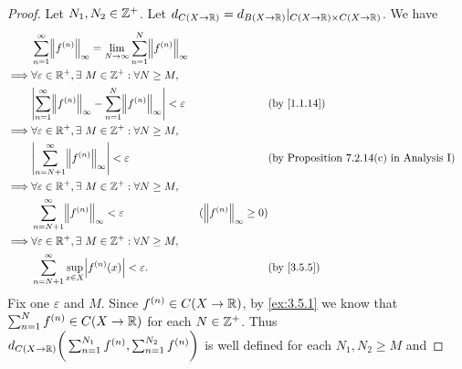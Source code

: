 \begin{proof}
  Let \(N_1, N_2 \in \mathbb{Z}^+\).
  Let \(d_{C(X \to \mathbb{R})} = d_{B(X \to \mathbb{R})}|_{C(X \to \mathbb{R}) \times C(X \to \mathbb{R})}\).
  We have
  \begin{align*}
             & \sum_{n = 1}^\infty \norm*{f^{(n)}}_\infty = \lim_{N \to \infty} \sum_{n = 1}^N \norm*{f^{(n)}}_\infty                                                                                     \\
    \implies & \forall \varepsilon \in \R^+, \exists\ M \in \Z^+ : \forall N \geq M,                                                                                                                      \\
             & \abs{\sum_{n = 1}^\infty \norm*{f^{(n)}}_\infty - \sum_{n = 1}^N \norm*{f^{(n)}}_\infty} < \varepsilon &                                 & \text{(by \cref{1.1.14})}                       \\
    \implies & \forall \varepsilon \in \R^+, \exists\ M \in \Z^+ : \forall N \geq M,                                                                                                                      \\
             & \abs{\sum_{n = N + 1}^\infty \norm*{f^{(n)}}_\infty} < \varepsilon                                     &                                 & \text{(by Proposition 7.2.14(c) in Analysis I)} \\
    \implies & \forall \varepsilon \in \R^+, \exists\ M \in \Z^+ : \forall N \geq M,                                                                                                                      \\
             & \sum_{n = N + 1}^\infty \norm*{f^{(n)}}_\infty < \varepsilon                                           & (\norm*{f^{(n)}}_\infty \geq 0)                                                   \\
    \implies & \forall \varepsilon \in \R^+, \exists\ M \in \Z^+ : \forall N \geq M,                                                                                                                      \\
             & \sum_{n = N + 1}^\infty \sup_{x \in X} \abs{f^{(n)}(x)} < \varepsilon.                                 &                                 & \by{3.5.5}
  \end{align*}
  Fix one \(\varepsilon\) and \(M\).
  Since \(f^{(n)} \in C(X \to \mathbb{R})\), by \cref{ex:3.5.1} we know that \(\sum_{n = 1}^N f^{(n)} \in C(X \to \mathbb{R})\) for each \(N \in \mathbb{Z}^+\).
  Thus \(d_{C(X \to \mathbb{R})}\bigg(\sum_{n = 1}^{N_1} f^{(n)}, \sum_{n = 1}^{N_2} f^{(n)}\bigg)\) is well defined for each \(N_1, N_2 \geq M\) and

\end{proof}
